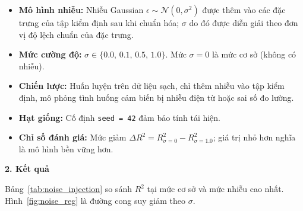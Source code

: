 \begin{itemize}
    \item \textbf{Mô hình nhiễu:} Nhiễu Gaussian $\epsilon \sim \mathcal{N}(0, \sigma^2)$ được thêm vào các đặc trưng của tập kiểm định sau khi chuẩn hóa; $\sigma$ do đó được diễn giải theo đơn vị độ lệch chuẩn của đặc trưng.
    \item \textbf{Mức cường độ:} $\sigma \in \{0.0,\, 0.1,\, 0.5,\, 1.0\}$. Mức $\sigma = 0$ là mức cơ sở (không có nhiễu).
    \item \textbf{Chiến lược:} Huấn luyện trên dữ liệu sạch, chỉ thêm nhiễu vào tập kiểm định, mô phỏng tình huống cảm biến bị nhiễu điện từ hoặc sai số đo lường.
    \item \textbf{Hạt giống:} Cố định \texttt{seed = 42} đảm bảo tính tái hiện.
    \item \textbf{Chỉ số đánh giá:} Mức giảm $\Delta R^2 = R^2_{\sigma=0} - R^2_{\sigma=1.0}$; giá trị nhỏ hơn nghĩa là mô hình bền vững hơn.
\end{itemize}

\textbf{2. Kết quả}

Bảng~\ref{tab:noise_injection} so sánh $R^2$ tại mức cơ sở và mức nhiễu cao nhất.
Hình~\ref{fig:noise_reg} là đường cong suy giảm theo $\sigma$.

\begin{table}[h]
\centering
\caption{$R^2$ tại mức cơ sở ($\sigma=0$) và mức nhiễu cao nhất ($\sigma=1.0$), cùng độ giảm $\Delta R^2$.
Ô đánh dấu ($\dagger$) biểu thị kết quả bất thường do mô hình sụp đổ.}
\label{tab:noise_injection}
\end{table}

